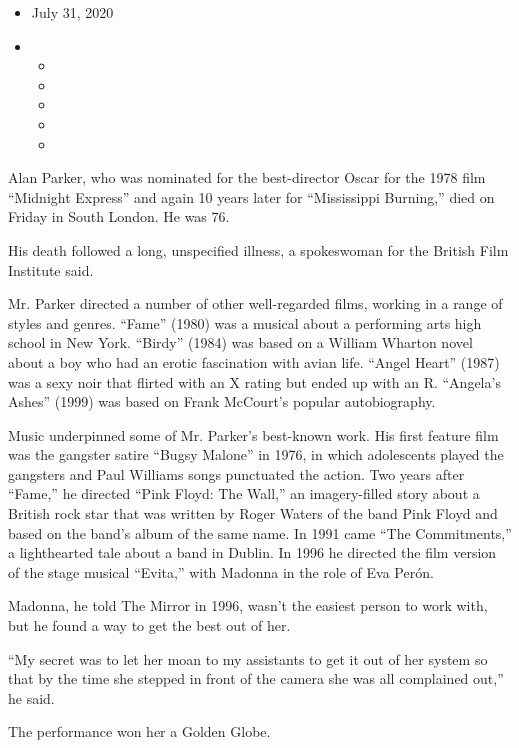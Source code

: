 \begin{itemize}
\item
  July 31, 2020
\item
  \begin{itemize}
  \item
  \item
  \item
  \item
  \item
  \end{itemize}
\end{itemize}

Alan Parker, who was nominated for the best-director Oscar for the 1978
film ``Midnight Express'' and again 10 years later for ``Mississippi
Burning,'' died on Friday in South London. He was 76.

His death followed a long, unspecified illness, a spokeswoman for the
British Film Institute said.

Mr. Parker directed a number of other well-regarded films, working in a
range of styles and genres. ``Fame'' (1980) was a musical about a
performing arts high school in New York. ``Birdy'' (1984) was based on a
William Wharton novel about a boy who had an erotic fascination with
avian life. ``Angel Heart'' (1987) was a sexy noir that flirted with an
X rating but ended up with an R. ``Angela's Ashes'' (1999) was based on
Frank McCourt's popular autobiography.

Music underpinned some of Mr. Parker's best-known work. His first
feature film was the gangster satire ``Bugsy Malone'' in 1976, in which
adolescents played the gangsters and Paul Williams songs punctuated the
action. Two years after ``Fame,'' he directed ``Pink Floyd: The Wall,''
an imagery-filled story about a British rock star that was written by
Roger Waters of the band Pink Floyd and based on the band's album of the
same name. In 1991 came ``The Commitments,'' a lighthearted tale about a
band in Dublin. In 1996 he directed the film version of the stage
musical ``Evita,'' with Madonna in the role of Eva Perón.

Madonna, he told The Mirror in 1996, wasn't the easiest person to work
with, but he found a way to get the best out of her.

``My secret was to let her moan to my assistants to get it out of her
system so that by the time she stepped in front of the camera she was
all complained out,'' he said.

The performance won her a Golden Globe.

